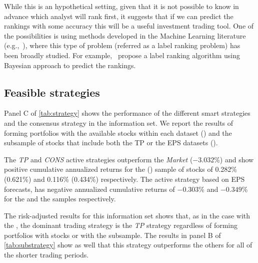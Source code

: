 \documentclass[a4paper,12pt,openright,notitlepage]{report}\usepackage[]{graphicx}\usepackage[]{color}
\begin{document}
While this is an hypothetical setting, given that it is not possible to know in advance which analyst will rank first, it suggests that if we can predict the rankings with some accuracy this will be a useful investment trading tool. One of the possibilities is using methods developed in the Machine Learning literature (e.g.,~\cite{aiguzhinov2010,brazdil2003}), where this type of problem (referred as a label ranking problem) has been broadly studied. For example,~\cite{aiguzhinov2010} propose a label ranking algorithm using Bayesian approach to predict the rankings.



\subsection{Feasible strategies}
Panel C of \ref{tab:strategy} shows the performance of the different smart strategies and the consensus strategy in the \naive{} information set. We report the results of forming portfolios with the available stocks within each dataset (\all{}) and the subsample of stocks that include both the TP or the EPS datasets (\same{}).

The \textit{TP} and \textit{CONS} active strategies outperform the \textit{Market} (\ensuremath{-3.032}\%)  and show positive cumulative annualized returns for the \all{} (\same{}) sample of stocks of 0.282\% (0.621\%) and  0.116\% (0.434\%) respectively. The active strategy based on EPS forecasts, has negative annualized cumulative returns of  \ensuremath{-0.303}\% and \ensuremath{-0.349}\% for the \all{} and the \same{} samples respectively.

The risk-adjusted results for this information set shows that, as in the case with the \tr{}, the dominant trading strategy is the \textit{TP} strategy regardless of forming portfolios with \all{} stocks or with the \same{} subsample.
The results in panel B of \ref{tab:substrategy} show as well that this strategy outperforms the others for all of the shorter trading periods.
\end{document}
